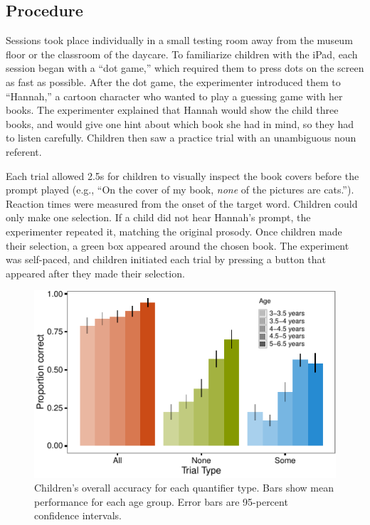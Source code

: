 \documentclass[10pt, letterpaper]{article}
\newenvironment{CodeChunk}{}{}
\begin{document}
\subsection{Procedure}\label{procedure}

Sessions took place individually in a small testing room away from the
museum floor or the classroom of the daycare. To familiarize children
with the iPad, each session began with a ``dot game,'' which required
them to press dots on the screen as fast as possible. After the dot
game, the experimenter introduced them to ``Hannah,'' a cartoon
character who wanted to play a guessing game with her books. The
experimenter explained that Hannah would show the child three books, and
would give one hint about which book she had in mind, so they had to
listen carefully. Children then saw a practice trial with an unambiguous
noun referent.

Each trial allowed 2.5s for children to visually inspect the book covers
before the prompt played (e.g., ``On the cover of my book, \emph{none}
of the pictures are cats.''). Reaction times were measured from the
onset of the target word. Children could only make one selection. If a
child did not hear Hannah's prompt, the experimenter repeated it,
matching the original prosody. Once children made their selection, a
green box appeared around the chosen book. The experiment was
self-paced, and children initiated each trial by pressing a button that
appeared after they made their selection.

\begin{CodeChunk}
\begin{figure}[t]
\includegraphics{figs/overall_acc-1} \caption[Children's overall accuracy for each quantifier type]{Children's overall accuracy for each quantifier type. Bars show mean performance for each age group. Error bars are 95-percent confidence intervals.}\label{fig:overall_acc}
\end{figure}
\end{CodeChunk}
\end{document}
